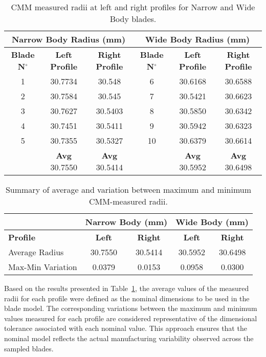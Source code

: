 \begin{table}[H]
    \centering
    \caption{CMM measured radii at left and right profiles for Narrow and Wide Body blades.}
    \begin{tabular}{ccc|ccc}
    \hline
    \multicolumn{3}{c}{\textbf{Narrow Body Radius (mm)}} & \multicolumn{3}{c}{\textbf{Wide Body Radius (mm)}} \\ \hline
    \textbf{Blade N$^{\circ}$} & \textbf{Left Profile} & \textbf{Right Profile} & \textbf{Blade N$^{\circ}$} & \textbf{Left Profile} & \textbf{Right Profile} \\ \hline
    1 & 30.7734 & 30.548  & 6 & 30.6168 & 30.6588 \\
    2 & 30.7584 & 30.545  & 7 & 30.5421 & 30.6623 \\
    3 & 30.7627 & 30.5403 & 8 & 30.5850 & 30.6342 \\ 
    4 & 30.7451 & 30.5411 & 9 & 30.5942 & 30.6323 \\ 
    5 & 30.7355 & 30.5327 & 10 & 30.6379 & 30.6614 \\ \hline
     & \textbf{Avg} 30.7550 & \textbf{Avg} 30.5414 & & \textbf{Avg} 30.5952 & \textbf{Avg} 30.6498 \\ \hline
    \end{tabular}
\end{table}
    
\begin{table}[H]
    \centering
    \caption{Summary of average and variation between maximum and minimum CMM-measured radii.}
    \label{tab:radii}
    \begin{tabular}{l|cc|cc}
        \hline
        \textbf{} & \multicolumn{2}{c|}{\textbf{Narrow Body (mm)}} & \multicolumn{2}{c}{\textbf{Wide Body (mm)}} \\ \hline
        \textbf{Profile} & \textbf{Left} & \textbf{Right} & \textbf{Left} & \textbf{Right} \\ \hline
        Average Radius & 30.7550 & 30.5414 & 30.5952 & 30.6498 \\
        Max-Min Variation & 0.0379 & 0.0153 & 0.0958 & 0.0300 \\ \hline
    \end{tabular}
\end{table}

Based on the results presented in Table~\ref{tab:radii}, the average values of the measured radii for each profile were defined as the nominal dimensions to be used in the blade model. The corresponding variations between the maximum and minimum values measured for each profile are considered representative of the dimensional tolerance associated with each nominal value. This approach ensures that the nominal model reflects the actual manufacturing variability observed across the sampled blades.

